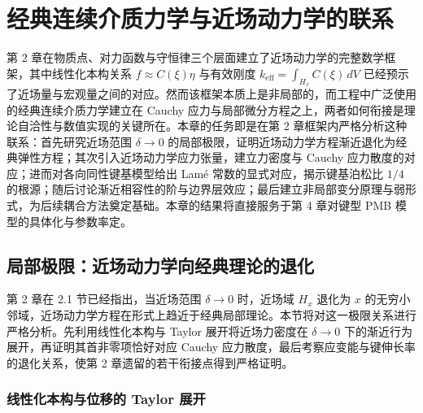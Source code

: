 \chapter{经典连续介质力学与近场动力学的联系}
\leavevmode\usetikzlibrary{arrows.meta, positioning, calc}

第 2 章在物质点、对力函数与守恒律三个层面建立了近场动力学的完整数学框架，其中线性化本构关系 $f \approx C(\xi)\eta$ 与有效刚度 $k_{\mathrm{eff}}=\int_{H_x}C(\xi)\,dV$ 已经预示了近场量与宏观量之间的对应。然而该框架本质上是非局部的，而工程中广泛使用的经典连续介质力学建立在 Cauchy 应力与局部微分方程之上，两者如何衔接是理论自洽性与数值实现的关键所在。本章的任务即是在第 2 章框架内严格分析这种联系：首先研究近场范围 $\delta\to 0$ 的局部极限，证明近场动力学方程渐近退化为经典弹性方程；其次引入近场动力学应力张量，建立力密度与 Cauchy 应力散度的对应；进而对各向同性键基模型给出 Lam\'e 常数的显式对应，揭示键基泊松比 $1/4$ 的根源；随后讨论渐近相容性的阶与边界层效应；最后建立非局部变分原理与弱形式，为后续耦合方法奠定基础。本章的结果将直接服务于第 4 章对键型 PMB 模型的具体化与参数率定。

\section{局部极限：近场动力学向经典理论的退化}
\label{sec:local-limit}

第 2 章在 2.1 节已经指出，当近场范围 $\delta\to 0$ 时，近场域 $H_x$ 退化为 $x$ 的无穷小邻域，近场动力学方程在形式上趋近于经典局部理论。本节将对这一极限关系进行严格分析。先利用线性化本构与 Taylor 展开将近场力密度在 $\delta\to 0$ 下的渐近行为展开，再证明其首非零项恰好对应 Cauchy 应力散度，最后考察应变能与键伸长率的退化关系，使第 2 章遗留的若干衔接点得到严格证明。

\subsection{线性化本构与位移的 Taylor 展开}
\label{subsec:taylor-expansion}

